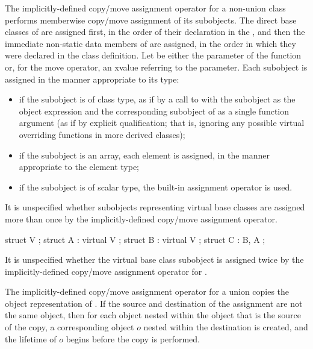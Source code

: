 \pnum
The implicitly-defined copy/move assignment operator for a
non-union class  performs memberwise copy/move assignment of its subobjects. The direct
base classes of  are assigned first, in the order of their declaration in the
, and then the immediate non-static data members of
 are assigned, in the order in which they were declared in the class
definition.
Let  be either the parameter of the function or, for the move operator, an
xvalue referring to the parameter.
Each subobject is assigned in the manner appropriate to its type:
\begin{itemize}
\item
if the subobject is of class type,
as if by a call to  with the subobject as the object expression
and the corresponding subobject of  as a single function argument
(as if by explicit qualification; that is,
ignoring any possible virtual overriding functions in more derived classes);
\item
if the subobject is an array, each element is assigned,
in the manner appropriate to the element type;
\item
if the subobject is of scalar type,
the built-in assignment operator is used.
\end{itemize}

%
It is unspecified whether subobjects representing virtual base classes
are assigned more than once by the implicitly-defined copy/move assignment
operator.
\begin{example}
\begin{codeblock}
struct V { };
struct A : virtual V { };
struct B : virtual V { };
struct C : B, A { };
\end{codeblock}

It is unspecified whether the virtual base class subobject
is assigned twice by the implicitly-defined copy/move assignment operator for
.
\end{example}

\pnum
The implicitly-defined copy/move assignment operator for a
union  copies the object representation of .
If the source and destination of the assignment are not the same object, then
for each object nested within
the object that is the source of the copy,
a corresponding object $o$ nested within the destination is created,
and the lifetime of $o$ begins before the copy is performed.

